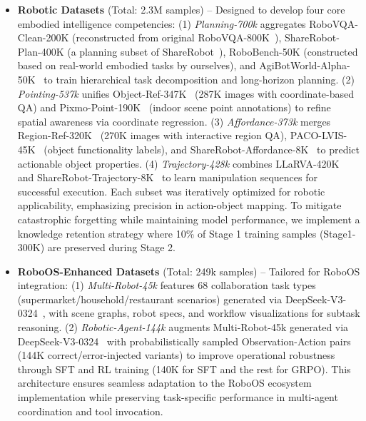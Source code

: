 \begin{itemize}[left=1em]
    \item \textbf{Robotic Datasets} (Total: 2.3M samples) – Designed to develop four core embodied intelligence competencies:  
    (1) \textit{Planning-700k} aggregates RoboVQA-Clean-200K (reconstructed from original RoboVQA-800K~\cite{sermanet2024robovqa}), ShareRobot-Plan-400K (a planning subset of ShareRobot~\cite{ji2025robobrain}), RoboBench-50K (constructed based on real-world embodied tasks by ourselves), and AgiBotWorld-Alpha-50K~\cite{bu2025agibot} to train hierarchical task decomposition and long-horizon planning.  
    (2) \textit{Pointing-537k} unifies Object-Ref-347K~\cite{yuan2024robopoint} (287K images with coordinate-based QA) and Pixmo-Point-190K~\cite{deitke2024molmo} (indoor scene point annotations) to refine spatial awareness via coordinate regression.  
    (3) \textit{Affordance-373k} merges Region-Ref-320K~\cite{yuan2024robopoint} (270K images with interactive region QA), PACO-LVIS-45K~\cite{ramanathan2023paco} (object functionality labels), and ShareRobot-Affordance-8K~\cite{ji2025robobrain} to predict actionable object properties.  
    (4) \textit{Trajectory-428k} combines LLaRVA-420K~\cite{niu2024llarva} and ShareRobot-Trajectory-8K~\cite{yuan2024robopoint} to learn manipulation sequences for successful execution. Each subset was iteratively optimized for robotic applicability, emphasizing precision in action-object mapping. To mitigate catastrophic forgetting while maintaining model performance, we implement a knowledge retention strategy where 10\% of Stage 1 training samples (Stage1-300K) are preserved during Stage 2.

    \item \textbf{RoboOS-Enhanced Datasets} (Total: 249k samples) – Tailored for RoboOS integration:  
    (1) \textit{Multi-Robot-45k} features 68 collaboration task types (supermarket/household/restaurant scenarios) generated via DeepSeek-V3-0324~\cite{liu2024deepseek}, with scene graphs, robot specs, and workflow visualizations for subtask reasoning.  
    (2) \textit{Robotic-Agent-144k} augments Multi-Robot-45k generated via DeepSeek-V3-0324~\cite{liu2024deepseek} with probabilistically sampled Observation-Action pairs (144K correct/error-injected variants) to improve operational robustness through SFT and RL training (140K for SFT and the rest for GRPO). This architecture ensures seamless adaptation to the RoboOS ecosystem implementation while preserving task-specific performance in multi-agent coordination and tool invocation.
\end{itemize}

